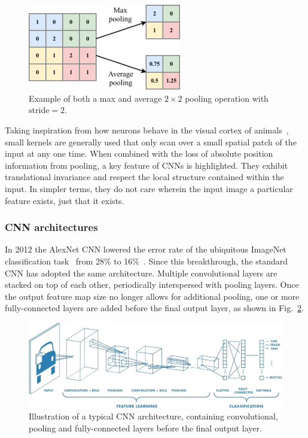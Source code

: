 \begin{figure} %
    \includegraphics[width=0.6\textwidth]{diagrams/6-cvn/pooling.pdf}
    \caption[Example of pooling operation.]
    {Example of both a max and average $2 \times 2$ pooling operation with $\mathrm{stride}=2$.}
    \label{fig:pooling}
\end{figure}

Taking inspiration from how neurons behave in the visual cortex of animals~\cite{lecun2015}, small
kernels are generally used that only scan over a small spatial patch of the input at any one time.
When combined with the loss of absolute position information from pooling, a key feature of CNNs
is highlighted. They exhibit translational invariance and respect the local structure contained
within the input. In simpler terms, they do not care wherein the input image a particular feature
exists, just that it exists.

\subsubsection*{CNN architectures}

In 2012 the AlexNet CNN lowered the error rate of the ubiquitous ImageNet classification
task~\cite{deng2009} from 28\% to 16\%~\cite{krizhevsky2012}. Since this breakthrough, the
standard CNN has adopted the same architecture. Multiple convolutional layers are stacked on top
of each other, periodically interspersed with pooling layers. Once the output feature map size no
longer allows for additional pooling, one or more fully-connected layers are added before the
final output layer, as shown in Fig.~\ref{fig:conv_diagram}.

\begin{figure} %
    \includegraphics[width=\textwidth]{diagrams/6-cvn/conv_diagram.jpeg}
    \caption[Typical CNN architecture]
    {Illustration of a typical CNN architecture, containing convolutional, pooling and
        fully-connected layers before the final output layer.}
    \label{fig:conv_diagram}
\end{figure}

